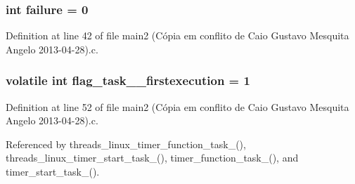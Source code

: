 \hypertarget{main2_01_07C_xC3_xB3pia_01em_01conflito_01de_01Caio_01Gustavo_01Mesquita_01Angelo_012013-04-28_08_8c_a4f35e5ea2395561d0bd3b2f45612dc2c}{
\subsubsection[{failure}]{\setlength{\rightskip}{0pt plus 5cm}int failure = 0}}\label{main2_01_07C_xC3_xB3pia_01em_01conflito_01de_01Caio_01Gustavo_01Mesquita_01Angelo_012013-04-28_08_8c_a4f35e5ea2395561d0bd3b2f45612dc2c}


Definition at line 42 of file main2 (\-Cópia em conflito de Caio Gustavo Mesquita Angelo 2013-\/04-\/28).\-c.

\hypertarget{main2_01_07C_xC3_xB3pia_01em_01conflito_01de_01Caio_01Gustavo_01Mesquita_01Angelo_012013-04-28_08_8c_a764ebf75ba887a9ecf7bf8fe124960e0}{
\subsubsection[{flag\-\_\-task\-\_\-1\-\_\-firstexecution}]{\setlength{\rightskip}{0pt plus 5cm}volatile int flag\-\_\-task\-\_\-\_\-firstexecution = 1}}\label{main2_01_07C_xC3_xB3pia_01em_01conflito_01de_01Caio_01Gustavo_01Mesquita_01Angelo_012013-04-28_08_8c_a764ebf75ba887a9ecf7bf8fe124960e0}


Definition at line 52 of file main2 (\-Cópia em conflito de Caio Gustavo Mesquita Angelo 2013-\/04-\/28).\-c.



Referenced by threads\-\_\-linux\-\_\-timer\-\_\-function\-\_\-task\-\_(), threads\-\_\-linux\-\_\-timer\-\_\-start\-\_\-task\-\_(), timer\-\_\-function\-\_\-task\-\_(), and timer\-\_\-start\-\_\-task\-\_().

